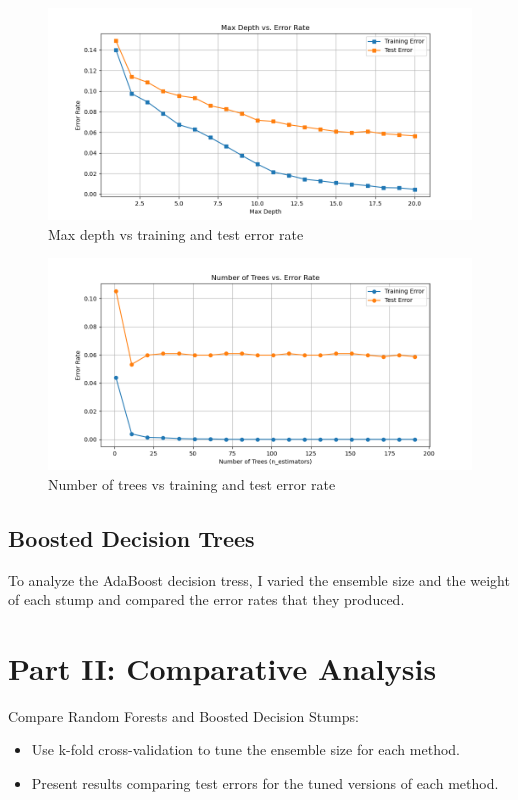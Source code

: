 \documentclass[12pt]{article}
\begin{document}
\begin{figure}[h!]
    \centering
    \includegraphics[width=0.8\linewidth]{figures/Random Forests/Max depth vs error rate.png}
    \caption{Max depth vs training and test error rate}
    \label{fig:mcc}
\end{figure}

\begin{figure}[h!]
    \centering
    \includegraphics[width=0.8\linewidth]{figures/Random Forests/Number of trees vs error rate.png}
    \caption{Number of trees vs training and test error rate}
    \label{fig:mcc}
\end{figure}

\subsection{Boosted Decision Trees}
To analyze the AdaBoost decision tress, I varied the ensemble size and the weight of each stump and compared the error rates that they produced.

\section{Part II: Comparative Analysis}
Compare Random Forests and Boosted Decision Stumps:
\begin{itemize}
    \item Use k-fold cross-validation to tune the ensemble size for each method.
    \item Present results comparing test errors for the tuned versions of each method.
\end{itemize}
\end{document}
